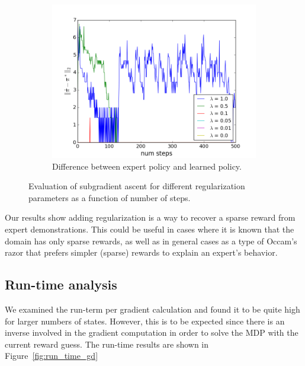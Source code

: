 \documentclass[10pt,a4paper]{article}
\begin{document}
\begin{figure}
    \begin{subfigure}[b]{0.65\textwidth}
        \includegraphics[width=\textwidth]{figs/policy_diff_reg_test.png}
        \caption{Difference between expert policy and learned policy.}
        \label{subfig:reg_policy_diff}
    \end{subfigure}
    \caption{Evaluation of subgradient ascent for different regularization parameters as a function of number of steps.}\label{fig:regularization_test}
\end{figure}

Our results show adding regularization is a way to recover a sparse reward from expert demonstrations. This could be useful in cases where it is known that the domain has only sparse rewards, as well as in general cases as a type of Occam's razor that prefers simpler (sparse) rewards to explain an expert's behavior.

\subsection{Run-time analysis}
We examined the run-term per gradient calculation and found it to be quite high for larger numbers of states. However, this is to be expected since there is an inverse involved in the gradient computation in order to solve the MDP with the current reward guess. The run-time results are shown in Figure~\ref{fig:run_time_gd}
\end{document}
